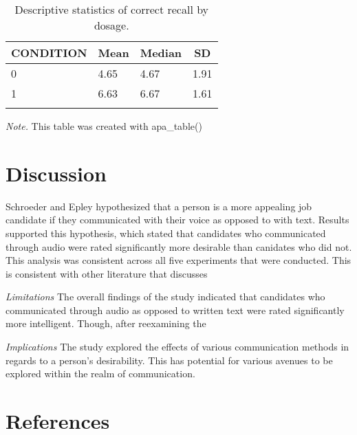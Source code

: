\documentclass[man]{apa6}
\begin{document}
\begin{table}[tbp]
\begin{center}
\begin{threeparttable}
\caption{\label{tab:unnamed-chunk-4}Descriptive statistics of correct recall by dosage.}
\begin{tabular}{llll}
\toprule
CONDITION & \multicolumn{1}{c}{Mean} & \multicolumn{1}{c}{Median} & \multicolumn{1}{c}{SD}\\
\midrule
0 & 4.65 & 4.67 & 1.91\\
1 & 6.63 & 6.67 & 1.61\\
\bottomrule
\addlinespace
\end{tabular}
\begin{tablenotes}[para]
\normalsize{\textit{Note.} This table was created with apa\_table()}
\end{tablenotes}
\end{threeparttable}
\end{center}
\end{table}

\section{Discussion}\label{discussion}

Schroeder and Epley hypothesized that a person is a more appealing job
candidate if they communicated with their voice as opposed to with text.
Results supported this hypothesis, which stated that candidates who
communicated through audio were rated significantly more desirable than
canidates who did not. This analysis was consistent across all five
experiments that were conducted. This is consistent with other
literature that discusses

\newpage

\emph{Limitations} The overall findings of the study indicated that
candidates who communicated through audio as opposed to written text
were rated significantly more intelligent. Though, after reexamining the

\emph{Implications} The study explored the effects of various
communication methods in regards to a person's desirability. This has
potential for various avenues to be explored within the realm of
communication.

\section{References}\label{references}

\begingroup
\setlength{\parindent}{-0.5in} \setlength{\leftskip}{0.5in}

\hypertarget{refs}{}

\endgroup

\clearpage

\renewcommand{\listtablename}{Table captions}

\listoftables
\end{document}
